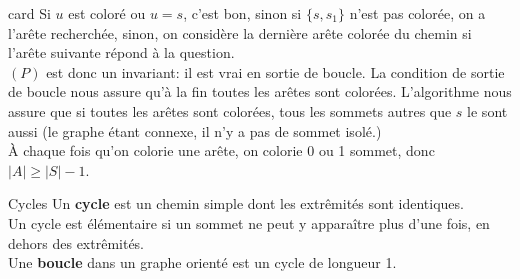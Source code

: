 \documentclass[french, 11pt]{article}
\begin{document}
\begin{prop}{}{card}
    Si $u$ est coloré ou $u=s$, c'est bon, sinon si $\{s,s_1\}$ n'est pas colorée, on a l'arête recherchée, sinon, on considère la dernière arête colorée du chemin si l'arête suivante répond à la question.\\
    $(P)$ est donc un invariant: il est vrai en sortie de boucle. La condition de sortie de boucle nous assure qu'à la fin toutes les arêtes sont colorées. L'algorithme nous assure que si toutes les arêtes sont colorées, tous les sommets autres que $s$ le sont aussi (le graphe étant connexe, il n'y a pas de sommet isolé.)\\
    À chaque fois qu'on colorie une arête, on colorie 0 ou 1 sommet, donc $|A|\geq|S|-1$.
\end{prop}

\begin{defi}{Cycles}{}
    Un \textbf{cycle} est un chemin simple dont les extrêmités sont identiques.\\
    Un cycle est élémentaire si un sommet ne peut y apparaître plus d'une fois, en dehors des extrêmités.\\
    Une \textbf{boucle} dans un graphe orienté est un cycle de longueur 1.
\end{defi}
\end{document}
